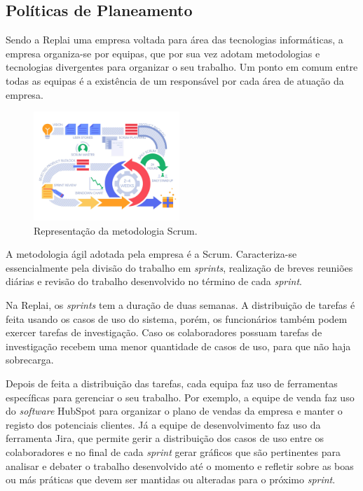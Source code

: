     
\newpage
\subsection{Políticas de Planeamento}
    Sendo a Replai uma empresa voltada para área das tecnologias informáticas, a empresa organiza-se por equipas, que por sua vez adotam metodologias e tecnologias divergentes para organizar o seu trabalho. Um ponto em comum entre todas as equipas é a existência de um responsável por cada área de atuação da empresa. 
    
    \begin{figure}
        \includegraphics[width=5.5cm]{images/Innovación-ágil.png}
        \caption{Representação da metodologia Scrum.}\label{wrap-fig:2}
    \end{figure}
    
    A metodologia ágil adotada pela empresa é a Scrum. Caracteriza-se essencialmente pela divisão do trabalho em \textit{sprints}, realização de breves reuniões diárias e revisão do trabalho desenvolvido no término de cada \textit{sprint}. 
    
    Na Replai, os \textit{sprints} tem a duração de duas semanas. A distribuição de tarefas é feita usando os casos de uso do sistema, porém, os funcionários também podem exercer tarefas de investigação. Caso os colaboradores possuam tarefas de investigação recebem uma menor quantidade de casos de uso, para que não haja sobrecarga.
    
    Depois de feita a distribuição das tarefas, cada equipa faz uso de ferramentas específicas para gerenciar o seu trabalho. Por exemplo, a equipe de venda faz uso do \textit{software} HubSpot para organizar o plano de vendas da empresa e manter o registo dos potenciais clientes. Já a equipe de desenvolvimento faz uso da ferramenta Jira, que permite gerir a distribuição dos casos de uso entre os colaboradores e no final de cada \textit{sprint} gerar gráficos que são pertinentes para analisar e debater o trabalho desenvolvido até o momento e refletir sobre as boas ou más práticas que devem ser mantidas ou alteradas para o próximo \textit{sprint}.  
    
